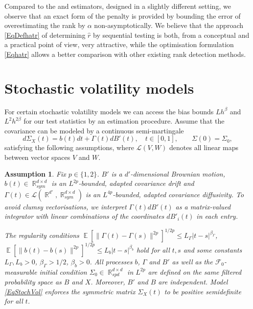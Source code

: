 \documentclass[preprint,aos]{imsart}
\numberwithin{equation}{section}
\newtheorem{assumption}[satz]{Assumption}
\theoremstyle{remark}
\DeclareMathOperator{\E}{{\mathbb E}}
\DeclareMathOperator{\R}{{\mathbb R}}
\providecommand{\abs}[1]{\lvert #1 \rvert}
\providecommand{\norm}[1]{\lVert #1 \rVert}
\renewcommand{\le}{\leqslant}
\begin{document}
Compared to the \citet{BaiNg2002} and \citet{ait2017} estimators, designed in a slightly different setting, we observe that an exact form of the penalty is provided by bounding the error of overestimating the rank by $\alpha$ non-asymptotically. We believe that the approach \eqref{EqDefhatr} of determining $\hat r$ by sequential testing is both, from a conceptual and a practical point of view, very attractive, while the optimisation formulation \eqref{Eqhatr} allows a better comparison with other existing rank detection methods.


\section{Stochastic volatility models} \label{SecStochVol}

For certain stochastic volatility models we can access the bias bounds $Lh^\beta$ and $L^2h^{2\beta}$ for our test statistics by an estimation procedure.
Assume that the covariance can be modeled by a continuous semi-martingale
\begin{equation}\label{EqStochVol}
d\Sigma_X(t)=b(t)dt+\Gamma(t)dB'(t),\quad t\in[0,1],\qquad \Sigma(0)=\Sigma_0,
\end{equation}
satisfying the following assumptions, where ${\mathcal L}(V,W)$ denotes all linear maps between vector spaces $V$ and $W$.

\begin{assumption}\label{AssStochVol}
Fix $p\in\{1,2\}$. $B'$ is a $d'$-dimensional Brownian motion, $b(t)\in\R^{d\times d}_{sym}$ is an $L^{2p}$-bounded, adapted covariance drift and  $\Gamma(t)\in {\mathcal L}(\R^{d'},\R^{d\times d}_{sym})$ is an $L^{4p}$-bounded, adapted covariance diffusivity. To avoid clumsy vectorisations, we interpret $\Gamma(t)dB'(t)$ as a matrix-valued integrator with linear combinations of the coordinates $dB'_i(t)$ in each entry.

The regularity conditions $\E[\norm{\Gamma(t)-\Gamma(s)}^{2p}]^{1/2p}\le L_\Gamma\abs{t-s}^{\beta_\Gamma}$, $\E[\norm{b(t)-b(s)}^{2p}]^{1/2p}\le L_b\abs{t-s}^{\beta_b}$ hold for all $t,s$ and some constants $L_\Gamma,L_b>0$, $\beta_\Gamma>1/2$, $\beta_b>0$. All processes $b$, $\Gamma$ and $B'$ as well as the ${\mathcal F}_0$-measurable initial condition $\Sigma_0\in\R^{d\times d}_{spd}$ in $L^{2p}$ are  defined on the same filtered probability space as $B$ and $X$. Moreover,  $B'$ and $B$  are independent. Model \eqref{EqStochVol} enforces the symmetric matrix $\Sigma_X(t)$ to be positive semidefinite for all $t$.
\end{assumption}
\end{document}
